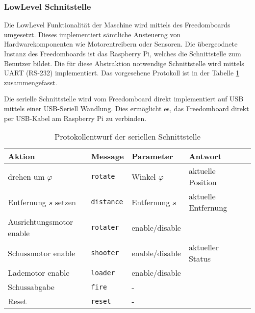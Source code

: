 \subsubsection{LowLevel Schnitstelle}
Die LowLevel Funktionalität der Maschine wird mittels des Freedomboards
umgesetzt. Dieses implementiert sämtliche Ansteuerng von Hardwarekomponenten
wie Motorentreibern oder Sensoren. Die übergeodnete Instanz des Freedomboards
ist das Raspberry Pi, welches die Schnittstelle zum Benutzer bildet. Die für
diese Abstraktion notwendige Schnittstelle wird mittels UART (RS-232)
implementiert. Das vorgesehene Protokoll ist in der Tabelle \ref{tab:uart}
zusammengefasst.

Die serielle Schnittstelle wird vom Freedomboard direkt implementiert auf
USB mittels einer USB-Seriell Wandlung. Dies ermöglicht es, das Freedomboard
direkt per USB-Kabel am Raspberry Pi zu verbinden.

\begin{table}[h!]
	\centering
	\begin{tabular}{l l l l l}
		Aktion & Message & Parameter & Antwort \\
		\hline
		drehen um $\varphi$ 
			& \verb!rotate!
			& Winkel $\varphi$
			& aktuelle Position \\
		Entfernung $s$ setzen
			& \verb!distance!
			& Entfernung $s$
			& aktuelle Entfernung \\
		Ausrichtungsmotor enable
			& \verb!rotater!
			& enable/disable
			& \\
		Schussmotor enable
			& \verb!shooter! 
			& enable/disable
			& aktueller Status \\
		Lademotor enable
			& \verb!loader!
			& enable/disable
			& \\
		Schussabgabe
			& \verb!fire!
			& -
			& \\
		Reset
			& \verb!reset!
			& -
			& \\
	\end{tabular}
	\caption{Protokollentwurf der seriellen Schnittstelle}
	\label{tab:uart}
\end{table}
